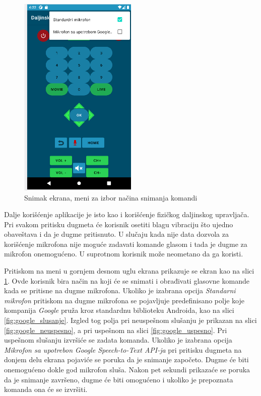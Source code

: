 \documentclass[implementacija.tex]{subfiles}
\begin{document}
\begin{figure}[h!]
  \centering
  \includegraphics[width=0.5\textwidth,keepaspectratio]{Implementacija/snimci_ekrana/meni.png}
  \caption{Snimak ekrana, meni za izbor načina snimanja komandi}
   \label{fig:meni_komande}
\end{figure}

Dalje korišćenje aplikacije je isto kao i korišćenje fizičkog daljinskog upravljača. Pri svakom pritisku dugmeta će korisnik osetiti blagu vibraciju što ujedno obaveštava i da je dugme pritisnuto. U slučaju kada nije data dozvola za korišćenje mikrofona nije moguće zadavati komande glasom i tada je dugme za mikrofon onemogućeno. U suprotnom korisnik može neometano da ga koristi. 

Pritiskom na meni u gornjem desnom uglu ekrana prikazuje se ekran kao na slici \ref{fig:meni_komande}. Ovde korisnik bira način na koji će se snimati i obrađivati glasovne komande kada se pritisne na dugme mikrofona. Ukoliko je izabrana opcija \textit{Standarni mikrofon} pritiskom na dugme mikrofona se pojavljuje predefinisano polje koje kompanija \textit{Google} pruža kroz standardnu biblioteku Androida, kao na slici \ref{fig:google_slusanje}. Izgled tog polja pri neuspešnom slušanju je prikazan na slici \ref{fig:google_neuspesno}, a pri uspešnom na slici \ref{fig:google_uspesno}. Pri uspešnom slušanju izvršiće se zadata komanda. Ukoliko je izabrana opcija \textit{Mikrofon sa upotrebon Google Speech-to-Text API-ja} pri pritisku dugmeta na donjem delu ekrana pojaviće se poruka da je snimanje započeto. Dugme će biti onemogućeno dokle god mikrofon sluša. Nakon pet sekundi prikazaće se poruka da je snimanje završeno, dugme će biti omogućeno i ukoliko je prepoznata komanda ona će se izvršiti.
\end{document}
